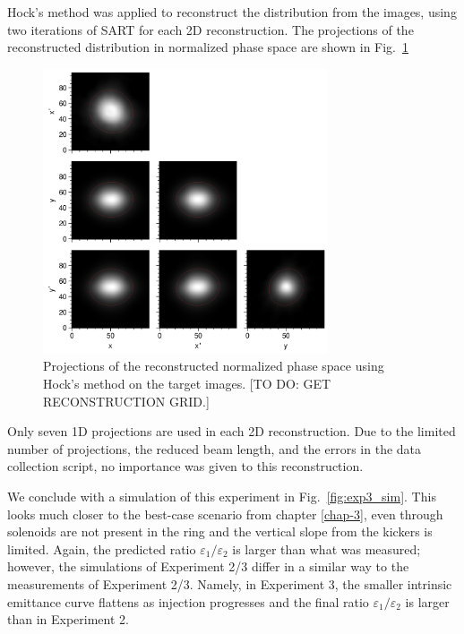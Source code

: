 Hock's method was applied to reconstruct the distribution from the images, using two iterations of SART for each 2D reconstruction. The projections of the reconstructed distribution in normalized phase space are shown in Fig.~\ref{fig:exp3_rec_corner_Hock}
%
\begin{figure}[!p]
    \centering
    \includegraphics[width=0.75\textwidth]{Images/chapter5/exp3/target_scan/rec_corner_Hock.png}
    \caption{Projections of the reconstructed normalized phase space using Hock's method on the target images. [TO DO: GET RECONSTRUCTION GRID.]}
    \label{fig:exp3_rec_corner_Hock}
\end{figure}
%
Only seven 1D projections are used in each 2D reconstruction. Due to the limited number of projections, the reduced beam length, and the errors in the data collection script, no importance was given to this reconstruction.

We conclude with a simulation of this experiment in Fig.~\ref{fig:exp3_sim}.
This looks much closer to the best-case scenario from chapter \ref{chap-3}, even through solenoids are not present in the ring and the vertical slope from the kickers is limited. Again, the predicted ratio $\varepsilon_1 / \varepsilon_2$ is larger than what was measured; however, the simulations of Experiment 2/3 differ in a similar way to the measurements of Experiment 2/3. Namely, in Experiment 3, the smaller intrinsic emittance curve flattens as injection progresses and the final ratio $\varepsilon_1 / \varepsilon_2$ is larger than in Experiment 2. 



